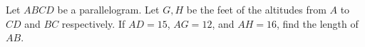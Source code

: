 Let $ABCD$ be a parallelogram. Let $G,H$ be the feet of the altitudes from $A$ to $CD$ and $BC$ respectively. If $AD=15$, $AG=12$, and $AH=16$, find the length of $AB$.